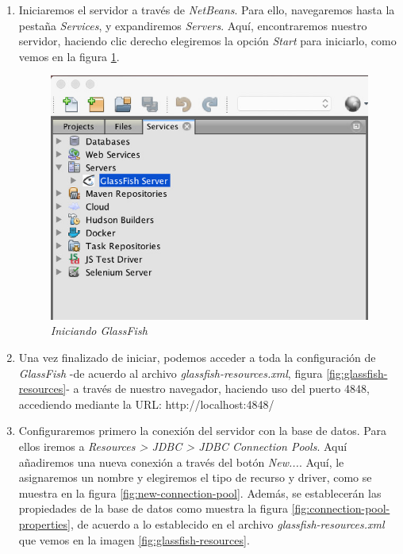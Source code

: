 \begin{enumerate}
\begin{enumerate}
\item Iniciaremos el servidor a través de \textit{NetBeans}. Para ello, navegaremos hasta la pestaña \textit{Services}, y expandiremos \textit{Servers}. Aquí, encontraremos nuestro servidor, haciendo clic derecho elegiremos la opción \textit{Start} para iniciarlo, como vemos en la figura \ref{fig:iniciar-glassfish}.

\begin{figure}[H]
\centering
  \includegraphics[scale=.95]{img/instalacion/iniciar-glassfish.jpg}
  \caption{\textit{Iniciando GlassFish}}
  \label{fig:iniciar-glassfish}
\end{figure}

\item Una vez finalizado de iniciar, podemos acceder a toda la configuración de \textit{GlassFish} -de acuerdo al archivo \textit{glassfish-resources.xml}, figura \ref{fig:glassfish-resources}- a través de nuestro navegador, haciendo uso del puerto 4848, accediendo mediante la URL: http://localhost:4848/ 
\item Configuraremos primero la conexión del servidor con la base de datos. Para ellos iremos a \textit{Resources > JDBC > JDBC Connection Pools}. Aquí añadiremos una nueva conexión a través del botón \textit{New...}. Aquí, le asignaremos un nombre y elegiremos el tipo de recurso y driver, como se muestra en la figura \ref{fig:new-connection-pool}. Además, se establecerán las propiedades de la base de datos como muestra la figura \ref{fig:connection-pool-properties}, de acuerdo a lo establecido en el archivo \textit{glassfish-resources.xml} que vemos en la imagen \ref{fig:glassfish-resources}.


\end{enumerate}
\end{enumerate}
